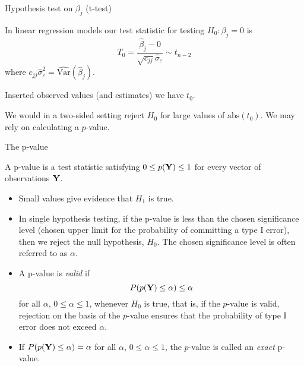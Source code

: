 \documentclass[ignorenonframetext,]{beamer}
\begin{document}
\begin{frame}

\begin{block}{Hypothesis test on \(\beta_j\) (t-test)}

In linear regression models our test statistic for testing
\(H_0: \beta_j=0\) is
\[T_0=\frac{\hat{\beta}_j-0}{\sqrt{c_{jj}}\hat{\sigma}_{\varepsilon}}\sim t_{n-2}\]
where
\(c_{jj}\hat{\sigma}_{\varepsilon}^2=\widehat{\text{Var}}(\hat{\beta}_j)\).

Inserted observed values (and estimates) we have \(t_0\).

We would in a two-sided setting reject \(H_0\) for large values of
\(\text{abs}(t_0)\). We may rely on calculating a \(p\)-value.

\end{block}

\end{frame}

\begin{frame}

\begin{block}{The p-value}

A p-value is a test statistic satisfying \(0 \leq p({\bf Y}) \leq 1\)
for every vector of observations \({\bf Y}\).

\begin{itemize}
\item
  Small values give evidence that \(H_1\) is true.
\item
  In single hypothesis testing, if the p-value is less than the chosen
  significance level (chosen upper limit for the probability of
  committing a type I error), then we reject the null hypothesis,
  \(H_0\). The chosen significance level is often referred to as
  \(\alpha\).
\item
  A p-value is \emph{valid} if
  \[ P(p({\bf Y}) \leq \alpha) \leq \alpha\] for all \(\alpha\),
  \(0 \leq \alpha \leq 1\), whenever \(H_0\) is true, that is, if the
  \(p\)-value is valid, rejection on the basis of the \(p\)-value
  ensures that the probability of type I error does not exceed
  \(\alpha\).
\item
  If \(P(p({\bf Y}) \leq \alpha) = \alpha\) for all \(\alpha\),
  \(0 \leq \alpha \leq 1\), the \(p\)-value is called an \emph{exact}
  p-value.
\end{itemize}

\end{block}

\end{frame}
\end{document}
